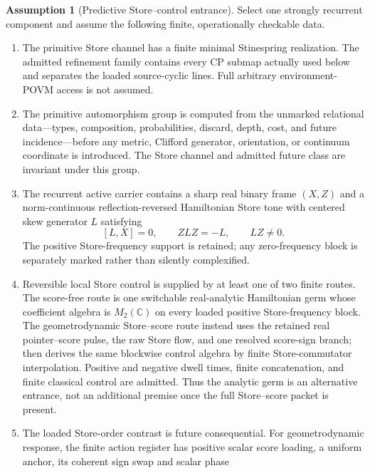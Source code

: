 \documentclass[11pt]{article}
\theoremstyle{definition}
\newtheorem{assumption}[theorem]{Assumption}
\theoremstyle{remark}
\newcommand{\C}{\mathbb C}
\begin{document}
\begin{assumption}[Predictive Store--control entrance]
\label{ass:predictive-store-control-entry}
\label{ass:predictive-clock-entry}
Select one strongly recurrent component and assume the following finite,
operationally checkable data.
\begin{enumerate}[label=\textup{(S\arabic*)},leftmargin=3em]
\item The primitive Store channel has a finite minimal Stinespring realization.
      The admitted refinement family contains every CP submap actually used
      below and separates the loaded source-cyclic lines.  Full arbitrary
      environment-POVM access is not assumed.
\item The primitive automorphism group is computed from the unmarked relational
      data---types, composition, probabilities, discard, depth, cost, and
      future incidence---before any metric, Clifford generator, orientation, or
      continuum coordinate is introduced.  The Store channel and admitted
      future class are invariant under this group.
\item The recurrent active carrier contains a sharp real binary frame $(X,Z)$
      and a norm-continuous reflection-reversed Hamiltonian Store tone with
      centered skew generator $L$ satisfying
      \[
        [L,X]=0,\qquad ZLZ=-L,\qquad LZ\ne0.
      \]
      The positive Store-frequency support is retained; any zero-frequency
      block is separately marked rather than silently complexified.
\item Reversible local Store control is supplied by at least one of two finite
      routes.  The score-free route is one switchable real-analytic Hamiltonian
      germ whose coefficient algebra is $M_2(\C)$ on every loaded positive
      Store-frequency block.  The geometrodynamic Store--score route instead
      uses the retained real pointer--score pulse, the raw Store flow, and one
      resolved score-sign branch; 
      then derives the same blockwise control algebra by finite
      Store-commutator interpolation.  Positive and negative dwell times,
      finite concatenation, and finite classical control are admitted.  Thus
      the analytic germ is an alternative entrance, not an additional premise
      once the full Store--score packet is present.
\item The loaded Store-order contrast is future consequential.  For
      geometrodynamic response, the finite action register has positive scalar
      score loading, a uniform anchor, its coherent sign swap and scalar phase

\end{enumerate}
\end{assumption}
\end{document}
